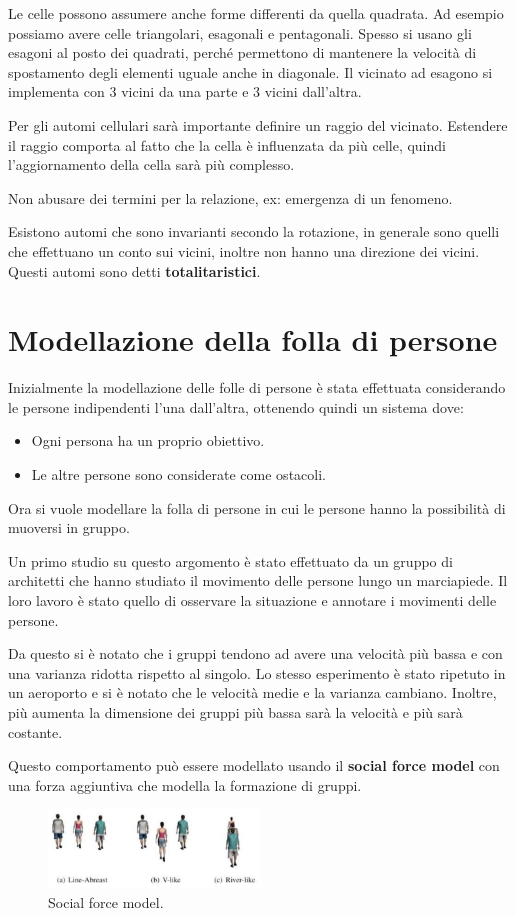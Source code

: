 \begin{nota}
    Le celle possono assumere anche forme differenti da quella quadrata. Ad esempio
    possiamo avere celle triangolari, esagonali e pentagonali. Spesso si usano gli
    esagoni al posto dei quadrati, perché permettono di mantenere la velocità di
    spostamento degli elementi uguale anche in diagonale. Il vicinato ad esagono si
    implementa con 3 vicini da una parte e 3 vicini dall'altra.
\end{nota}
Per gli automi cellulari sarà importante definire un raggio del vicinato. Estendere
il raggio comporta al fatto che la cella è influenzata da più celle, quindi
l'aggiornamento della cella sarà più complesso.
\begin{nota}
    Non abusare dei termini per la relazione, ex: emergenza di un fenomeno.
\end{nota}
Esistono automi che sono invarianti secondo la rotazione, in generale sono quelli
che effettuano un conto sui vicini, inoltre non hanno una direzione dei vicini.
Questi automi sono detti \textbf{totalitaristici}.
\section{Modellazione della folla di persone}
Inizialmente la modellazione delle folle di persone è stata effettuata considerando
le persone indipendenti l'una dall'altra, ottenendo quindi un sistema dove:
\begin{itemize}
    \item Ogni persona ha un proprio obiettivo.
    \item Le altre persone sono considerate come ostacoli.
\end{itemize}
Ora si vuole modellare la folla di persone in cui le persone hanno la possibilità
di muoversi in gruppo.

Un primo studio su questo argomento è stato effettuato da un gruppo di architetti
che hanno studiato il movimento delle persone lungo un marciapiede. Il loro lavoro
è stato quello di osservare la situazione e annotare i movimenti delle persone.

Da questo si è notato che i gruppi tendono ad avere una velocità più bassa e con
una varianza ridotta rispetto al singolo. Lo stesso esperimento è stato ripetuto
in un aeroporto e si è notato che le velocità medie e la varianza cambiano.
Inoltre, più aumenta la dimensione dei gruppi più bassa sarà la velocità e più
sarà costante.

Questo comportamento può essere modellato usando il \textbf{social force model}
con una forza aggiuntiva che modella la formazione di gruppi.
\begin{figure}[!ht]
    \centering
    \includegraphics[width=0.5\textwidth]{./img/modelli/trepersone.png}
    \caption{Social force model.}
    \label{fig:social_force_model}
\end{figure}

